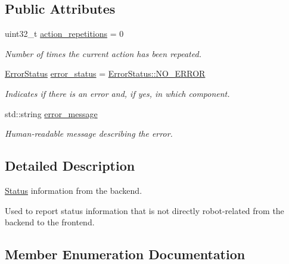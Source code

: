 \subsection*{Public Attributes}
\begin{DoxyCompactItemize}
\item 
uint32\+\_\+t \hyperlink{structrobot__interfaces_1_1Status_a8ccb682cd2ba81059991f3b0b9ff0c00}{action\+\_\+repetitions} = 0
\begin{DoxyCompactList}\small\item\em Number of times the current action has been repeated. \end{DoxyCompactList}\item 
\hyperlink{structrobot__interfaces_1_1Status_a88f1cb8387648815ca75754985bdb3b6}{Error\+Status} \hyperlink{structrobot__interfaces_1_1Status_a80ffe66121d425d48386b39984cd4c7b}{error\+\_\+status} = \hyperlink{structrobot__interfaces_1_1Status_a88f1cb8387648815ca75754985bdb3b6ad306b6fdee05fe87455110ddf6501e6c}{Error\+Status\+::\+N\+O\+\_\+\+E\+R\+R\+OR}
\begin{DoxyCompactList}\small\item\em Indicates if there is an error and, if yes, in which component. \end{DoxyCompactList}\item 
std\+::string \hyperlink{structrobot__interfaces_1_1Status_a7da10fb73cd19f2840c438d321eac744}{error\+\_\+message}
\begin{DoxyCompactList}\small\item\em Human-\/readable message describing the error. \end{DoxyCompactList}\end{DoxyCompactItemize}


\subsection{Detailed Description}
\hyperlink{structrobot__interfaces_1_1Status}{Status} information from the backend. 

Used to report status information that is not directly robot-\/related from the backend to the frontend. 

\subsection{Member Enumeration Documentation}
\mbox{\label{structrobot__interfaces_1_1Status_a88f1cb8387648815ca75754985bdb3b6}} 
